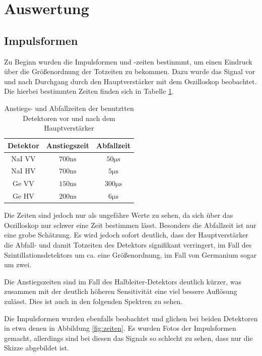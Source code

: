 \documentclass[
	parskip=half,10pt,
	numbers= noenddot, %
	toc=flat, %
	oneside,
	twocolumn,
	]{scrartcl}
\begin{document}
\section{Auswertung}

\subsection{Impulsformen}

Zu Beginn wurden die Impulsformen und -zeiten bestinmmt, um einen Eindruck über die Größenordnung der Totzeiten zu bekommen. Dazu wurde das Signal vor und nach 
Durchgang durch den Hauptverstärker mit dem Oszilloskop beobachtet. Die hierbei bestimmten Zeiten finden sich in Tabelle \ref{tab:zeiten}. 

\begin{table}
\centering
\begin{tabular}{ccc}
Detektor & Anstiegszeit & Abfallzeit \\
\hline
NaI VV & $700 \si{\nano \second}$ & $50 \si{\micro \second}$ \\
NaI HV & $700 \si{\nano \second}$ & $5 \si{\micro \second}$ \\
Ge  VV & $150 \si{\nano \second}$ & $300 \si{\micro \second}$\\
Ge  HV & $200 \si{\nano \second}$ & $6 \si{\micro \second}$ 
\end{tabular}
\caption{Anstiegs- und Abfallzeiten der benutztten Detektoren vor und nach dem Hauptverstärker}
\label{tab:zeiten}
\end{table}

Die Zeiten sind jedoch nur als ungefähre Werte zu sehen, da sich über das Oszilloskop nur schwer eine Zeit bestimmen lässt. Besonders die Abfallzeit ist nur 
eine grobe Schätzung. Es wird jedoch sofort deutlich, dass der Hauptverstärker die Abfall- und damit Totzeiten des Detektors signifikant verringert, 
im Fall des Szintillationsdetektors um ca. eine Größenordnung, im Fall von Germanium sogar um zwei. 

Die Anstiegszeiten sind im Fall des Halbleiter-Detektors deutlich kürzer, was zusammen mit der deutlich höheren Sensitivität eine viel bessere Auflösung zulässt. 
Dies ist auch in den folgenden Spektren zu sehen. 

Die Impulsformen wurden ebenfalls beobachtet und glichen bei beiden Detektoren in etwa denen in Abbildung \ref{fig:zeiten}. Es wurden Fotos der Impulsformen 
gemacht, allerdings sind bei diesen das Signals so schlecht zu sehen, dass nur die Skizze abgebildet ist.
\end{document}
